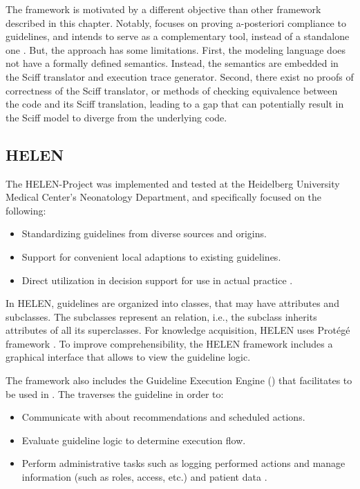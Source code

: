 The \GPROVE{} framework is motivated by a different objective than other
framework described in this chapter. Notably, \GPROVE{} focuses on proving
a-posteriori compliance to guidelines, and intends to serve as a complementary
tool, instead of a standalone one \cite{BottrighiBook10}. But, the
approach has some limitations.
First, the \GPROVE{} modeling language does not have a formally defined
semantics. Instead, the semantics are embedded in the Sciff translator and
execution trace generator. Second, there exist no proofs of correctness of
the Sciff translator, or methods of checking equivalence between the
\GOSPEL{} code and its Sciff translation, leading to a gap that can
potentially result in the Sciff model to diverge from the underlying \GOSPEL{}
code.

\subsection{HELEN}\label{sec:helen}

The HELEN-Project was implemented and tested at
the Heidelberg University Medical Center's Neonatology Department,
and specifically focused on the following:
\begin{itemize}
  \item Standardizing guidelines from diverse sources and origins.
  \item Support for convenient local adaptions to existing guidelines.
  \item Direct utilization in decision support for use in actual practice \cite{SkonetzkiMIM04}.
\end{itemize}

In HELEN, guidelines are organized into classes, that may have attributes and
subclasses. The subclasses represent an  relation, i.e., the subclass
inherits attributes of all its superclasses.
For knowledge acquisition, HELEN uses Prot\'eg\'e framework \cite{GennariIJHS03}.
To improve comprehensibility, the HELEN framework includes a graphical interface
that allows \HCPs{} to view the guideline logic.

The framework also includes the Guideline Execution Engine (\GEE{}) that
facilitates \BPGs{} to be used in \CDSSs{}. The \GEE{} traverses the guideline
in order to:
\begin{itemize}
  \item Communicate with \HCPs{} about recommendations and scheduled actions.
  \item Evaluate guideline logic to determine execution flow.
  \item Perform administrative tasks such as logging performed actions and
    manage \HCP{} information (such as roles, access, etc.) and patient data
    \cite{SkonetzkiMIM04}.
\end{itemize}

